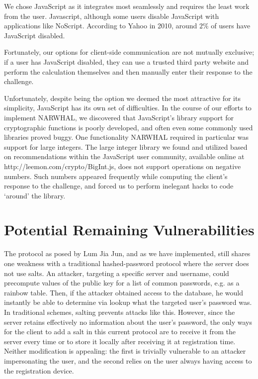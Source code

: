\documentclass[11pt]{article}
\begin{document}
We chose JavaScript as it integrates most seamlessly and requires the least work from the user. Javascript, although some users disable JavaScript with applications like NoScript. According to Yahoo in 2010, around $2\%$ of users have JavaScript disabled. 

Fortunately, our options for client-side communication are not mutually exclusive; if a user has JavaScript disabled, they can use a trusted third party website and perform the calculation themselves and then manually enter their response to the challenge.

Unfortunately, despite being the option we deemed the most attractive for its simplicity, JavaScript has its own set of difficulties.  In the course of our efforts to implement NARWHAL, we discovered that JavaScript’s library support for cryptographic functions is poorly developed, and often even some commonly used libraries proved buggy.  One functionality NARWHAL required in particular was support for large integers.  The large integer library we found and utilized based on recommendations within the JavaScript user community, available online at http://leemon.com/crypto/BigInt.js, does not support operations on negative numbers.  Such numbers appeared frequently while computing the client’s response to the challenge, and forced us to perform inelegant hacks to code ‘around’ the library.


\section{Potential Remaining Vulnerabilities}

The protocol as posed by Lum Jia Jun, and as we have implemented, still shares one weakness with a traditional hashed-password protocol where the server does not use salts.  An attacker, targeting a specific server and username, could precompute values of the public key for a list of common passwords, e.g. as a rainbow table.  Then, if the attacker obtained access to the database, he would instantly be able to determine via lookup what the targeted user’s password was.  In traditional schemes, salting prevents attacks like this.  However, since the server retains effectively no information about the user’s password, the only ways for the client to add a salt in this current protocol are to receive it from the server every time or to store it locally after receiving it at registration time.  Neither modification is appealing: the first is trivially vulnerable to an attacker impersonating the user, and the second relies on the user always having access to the registration device.
\end{document}
